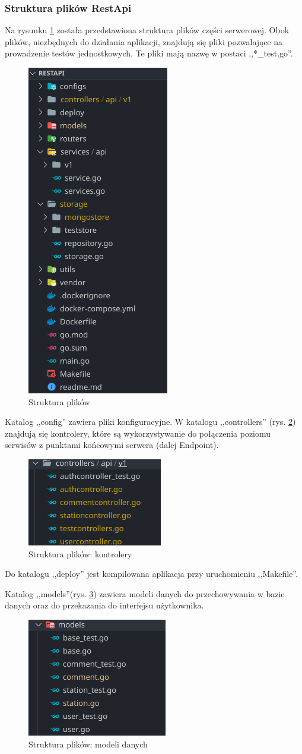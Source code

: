 \subsubsection{Struktura plików RestApi}
Na rysunku \ref{fig:backend_file_structure} została przedstawiona struktura plików części serwerowej. Obok plików, niezbędnych do działania aplikacji, znajdują się pliki pozwalające na prowadzenie testów jednostkowych. Te pliki mają nazwę w postaci ,,*\_test.go''.
\begin{figure}[ht]
\centering
\includegraphics[width=0.25\linewidth]{rys03/backend_file_structure.png}
\caption{Struktura plików}
\label{fig:backend_file_structure}
\end{figure}
\newpage
Katalog ,,config'' zawiera pliki konfiguracyjne.
W katalogu ,,controllers'' (rys. \ref{fig:controllers}) znajdują się kontrolery, które są wykorzystywanie do połączenia poziomu serwisów z punktami końcowymi serwera (dalej Endpoint).
\begin{figure}[ht]
\centering
\includegraphics[width=0.25\linewidth]{rys03/controllers.png}
\caption{Struktura plików: kontrolery}
\label{fig:controllers}
\end{figure}

Do katalogu ,,deploy'' jest kompilowana aplikacja przy uruchomieniu ,,Makefile''.

Katalog ,,models''(rys. \ref{fig:model}) zawiera modeli danych do przechowywania w bazie danych oraz do przekazania do interfejsu użytkownika.
\begin{figure}[ht]
\centering
\includegraphics[width=0.25\linewidth]{rys03/model.png}
\caption{Struktura plików: modeli danych}
\label{fig:model}
\end{figure}

